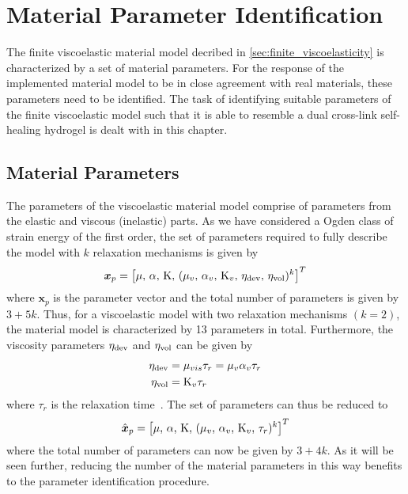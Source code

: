 \chapter{Material Parameter Identification}%
\label{chapter:four}
The finite viscoelastic material model decribed in \cref{sec:finite_viscoelasticity} is characterized by a set of material parameters. For the response of the implemented material model to be in close agreement with real materials, these parameters need to be identified. The task of identifying suitable parameters of the finite viscoelastic model such that it is able to resemble a dual cross-link self-healing hydrogel is dealt with in this chapter.

\section{Material Parameters}
The parameters of the viscoelastic material model comprise of parameters from the elastic and viscous (inelastic) parts. As we have considered a Ogden class of strain energy of the first order, the set of parameters required to fully describe the model with \(k\) relaxation mechanisms is given by
\begin{equation}
\bm{x}_p = \left[\mu,\,\alpha,\,\mathrm{K},\,(\mu_{v},\,\alpha_{v},\,\mathrm{K}_{v},\,\eta_{\text{dev}},\,\eta_{\text{vol}})^{k}\right]^{T} 
\label{eq:parameters}  
\end{equation}
where 
\(\bm{x}_p\) is the parameter vector and the total number of parameters is given by \(3+5k\). Thus, for a viscoelastic model with two relaxation mechanisms \((k=2)\), the material model is characterized by 13 parameters in total. Furthermore, the viscosity parameters \(\eta_{\text{dev}}\) and \(\eta_{\text{vol}}\) can be given by 
\begin{align}
    \eta_{\text{dev}} &= \mu_{vis} \tau_{r} = \mu_{v} \alpha_{v} \tau_{r} \label{eq:nd_rtime}\\
    \eta_{\text{vol}} &= \mathrm{K}_{v} \tau_{r} \label{eq:nv_rtime}
\end{align}
where \(\tau_{r}\) is the relaxation time~\cite{Kleuter2007Jul}. The set of parameters can thus be reduced to 
\begin{equation}
    {\hat{\bm{x}}_p} = {\left[\mu,\,\alpha,\,\mathrm{K},\,(\mu_{v},\,\alpha_{v},\,\mathrm{K}_{v},\,\tau_{r}){}^{k}\right]}^{T}   
    \label{eq:parameters_red}
\end{equation}
where the total number of parameters can now be given by \(3 + 4k\).
As it will be seen further, reducing the number of the material parameters in this way benefits to the parameter identification procedure. 

